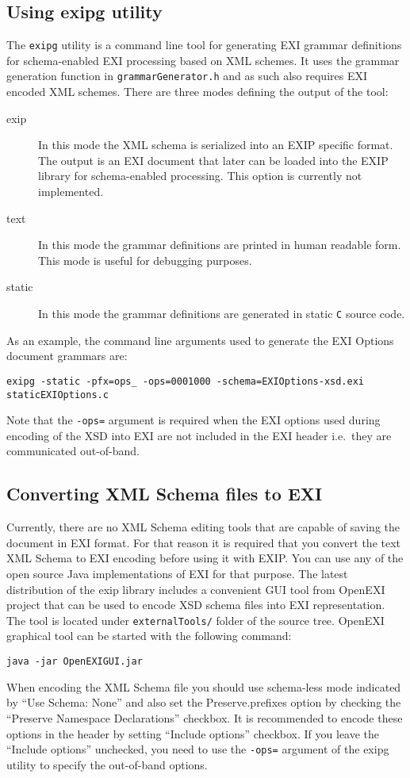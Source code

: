 \subsection{Using exipg utility}
The \texttt{exipg} utility is a command line tool for generating EXI grammar definitions
for schema-enabled EXI processing based on XML schemes.
It uses the grammar generation
function in \texttt{grammarGenerator.h} and as such also requires EXI encoded XML schemes.
There are three modes defining the output of the tool:
\begin{description}
 \item[exip] In this mode the XML schema is serialized into an EXIP specific format. The output is
	    an EXI document that later can be loaded into the EXIP library for schema-enabled processing.
	    This option is currently not implemented.
 \item[text] In this mode the grammar definitions are printed in human readable form. This mode is
	    useful for debugging purposes.
 \item[static] In this mode the grammar definitions are generated in static \texttt{C} source code.
 \end{description}
As an example, the command line arguments used to generate the EXI Options document grammars are:
\begin{lstlisting}
exipg -static -pfx=ops_ -ops=0001000 -schema=EXIOptions-xsd.exi staticEXIOptions.c
\end{lstlisting}
Note that the \texttt{-ops=} argument is required when the EXI options used during encoding of
the XSD into EXI are not included in the EXI header i.e.\ they are communicated
out-of-band.

\subsection{Converting XML Schema files to EXI}
Currently, there are no XML Schema editing tools that are capable of saving the document in EXI format.
For that reason it is required that you convert the text XML Schema to EXI encoding before using it
with EXIP. You can use any of the open source Java implementations of EXI for that purpose.
The latest distribution of the exip library includes a convenient GUI tool from OpenEXI project
that can be used to encode XSD schema files into EXI representation. The tool is located
under \texttt{externalTools/} folder of the source tree. OpenEXI graphical tool can
be started with the following command:
\begin{lstlisting}
java -jar OpenEXIGUI.jar
\end{lstlisting}
When encoding the XML Schema file you should use schema-less mode indicated by ``Use Schema: None''
and also set the Preserve.prefixes option by checking the ``Preserve Namespace Declarations''
checkbox. It is recommended to encode these options in the header by setting
``Include options'' checkbox. If you leave the ``Include options'' unchecked, you need to use the \texttt{-ops=} argument
of the exipg utility to specify the out-of-band options.